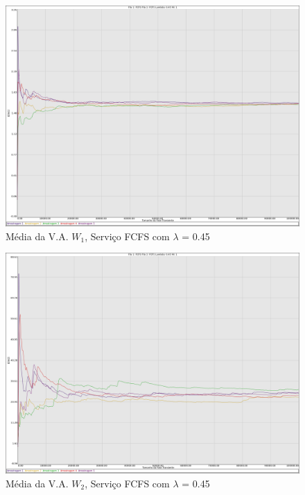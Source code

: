 \documentclass[a4paper,10pt]{article}
\begin{document}
\begin{figure}
	\caption{Média da V.A. $W_1$, Serviço FCFS com $\lambda$ = 0.45}
	\label{figTransienteFCFSfila1W}
	\includegraphics[scale = 0.20]{./graficos_transiente_1/FCFS/07.png}
\end{figure}

\begin{figure}
	\caption{Média da V.A. $W_2$, Serviço FCFS com $\lambda$ = 0.45}
	\label{figTransienteFCFSfila2W}
	\includegraphics[scale = 0.20]{./graficos_transiente_1/FCFS/08.png}
\end{figure}
\end{document}
